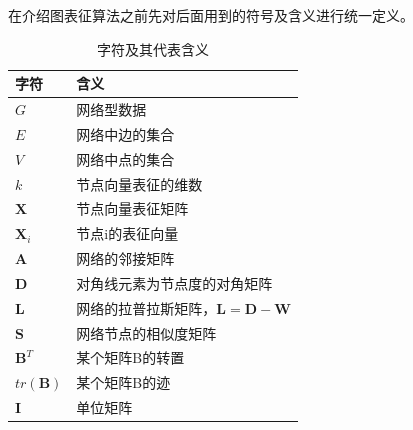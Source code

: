 在介绍图表征算法之前先对后面用到的符号及含义进行统一定义。
\begin{table}
	\centering
	\caption{字符及其代表含义}
	\begin{tabular}{|C{1.8in}|C{3.3in}|}
		\hline
		\textbf{字符} & \textbf{含义} \\ \hline\hline
		$G$ & 网络型数据 \\ \hline
		$E$ & 网络中边的集合 \\ \hline
		$V$& 网络中点的集合 \\ \hline
		$k$ & 节点向量表征的维数  \\ \hline
		$\textbf{X}$ & 节点向量表征矩阵 \\ \hline
		$\textbf{X}_i$ & 节点i的表征向量 \\ \hline
		$\textbf{A}$ & 网络的邻接矩阵 \\ \hline
		$\textbf{D}$ & 对角线元素为节点度的对角矩阵\\ \hline
		$\textbf{L}$ & 网络的拉普拉斯矩阵，$\textbf{L}=\textbf{D}-\textbf{W}$ \\ \hline
		$\textbf{S}$ & 网络节点的相似度矩阵 \\ \hline
		$\textbf{B}^T$ & 某个矩阵B的转置 \\ \hline
		$tr(\textbf{B})$ & 某个矩阵B的迹 \\ \hline
		$\textbf{I}$ & 单位矩阵 \\ \hline
	\end{tabular}
\end{table}

